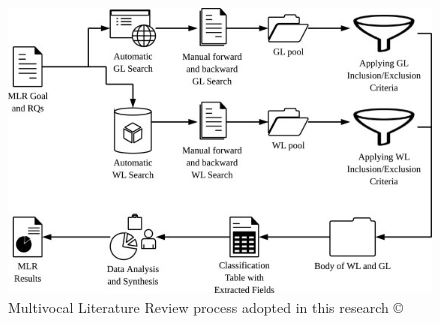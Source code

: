 \begin{figure}
  \includegraphics[width=\textwidth]{MLRprocess.jpg}
  \caption{Multivocal Literature Review process adopted in this research \copyright~\cite{SALTAN2021106510}}
 \label{fig:MLRprocess}
\end{figure}

